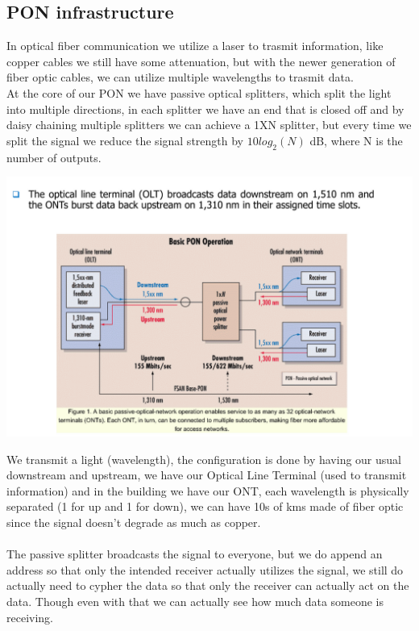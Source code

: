 \documentclass[11pt, a4paper]{article}
\begin{document}
\subsection{PON infrastructure}
In optical fiber communication we utilize a laser to trasmit information, like copper cables we still have some attenuation, but with the newer generation of fiber optic cables, we can utilize multiple wavelengths to trasmit data.\\
At the core of our PON we have passive optical splitters, which split the light into multiple directions, in each splitter we have an end that is closed off and by daisy chaining multiple splitters we can achieve a 1XN splitter, but every time we split the signal we reduce the signal strength by $10log_{2}(N)$ dB, where N is the number of outputs.\\
\begin{center}
    \includegraphics[scale=0.5]{img/AccessNetworks/PON/operations.png}
\end{center}
We transmit a light (wavelength), the configuration is done by having our usual downstream and upstream, we have our Optical Line Terminal (used to transmit information) and in the building we have our ONT, each wavelength is physically separated (1 for up and 1 for down), we can have 10s of kms made of fiber optic since the signal doesn't degrade as much as copper.\\\\
The passive splitter broadcasts the signal to everyone, but we do append an address so that only the intended receiver actually utilizes the signal, we still do actually need to cypher the data so that only the receiver can actually act on the data. Though even with that we can actually see how much data someone is receiving.\\\\
\end{document}
